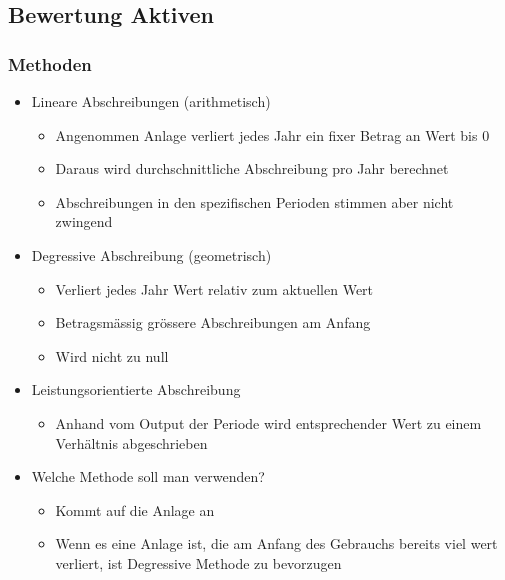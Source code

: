 \subsection{Bewertung Aktiven}
\subsubsection{Methoden}
\begin{itemize}
    \item Lineare Abschreibungen (arithmetisch)
    \begin{itemize}
        \item Angenommen Anlage verliert jedes Jahr ein fixer Betrag an Wert bis 0
        \item Daraus wird durchschnittliche Abschreibung pro Jahr berechnet
        \item Abschreibungen in den spezifischen Perioden stimmen aber nicht zwingend 
    \end{itemize}
    \item Degressive Abschreibung (geometrisch)
    \begin{itemize}
        \item Verliert jedes Jahr Wert relativ zum aktuellen Wert
        \item Betragsmässig grössere Abschreibungen am Anfang
        \item Wird nicht zu null
    \end{itemize}
    \item Leistungsorientierte Abschreibung
    \begin{itemize}
        \item Anhand vom Output der Periode wird entsprechender Wert zu einem Verhältnis abgeschrieben 
    \end{itemize}
    \item Welche Methode soll man verwenden?
    \begin{itemize}
        \item Kommt auf die Anlage an
        \item Wenn es eine Anlage ist, die am Anfang des Gebrauchs bereits viel wert verliert, ist Degressive Methode zu bevorzugen
    \end{itemize}
\end{itemize}


